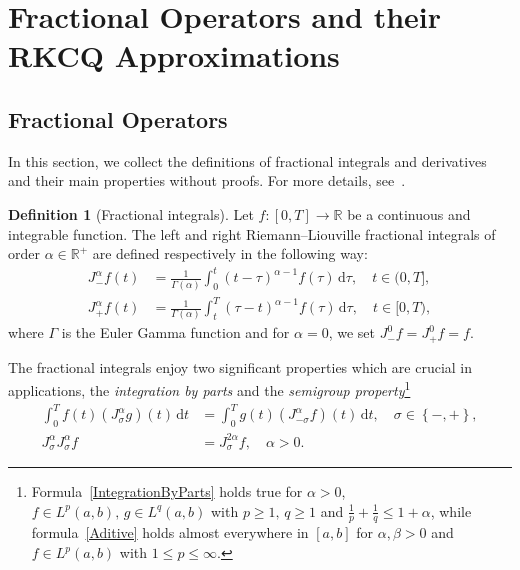 \documentclass[a4paper,10pt,reqno]{amsart}
\theoremstyle{definition}
\newtheorem{definition}{Definition}[section]
\newcommand{\R}{\mathbb{R}}      %
\newcommand{\Flder}{\rightarrow}
\newcommand{\dd}{\mathrm{d}}
\begin{document}
\section{Fractional Operators and their RKCQ Approximations}\label{FracIntegrals}

\subsection{Fractional Operators}
In this section, we collect the definitions of fractional integrals and derivatives and their main properties without proofs. For more details, see~\cite{TheBook2,TheBook}.

\begin{definition}[Fractional integrals]
Let $f:[0,T]\Flder\R$ be a continuous and integrable function. The left and right Riemann–Liouville fractional integrals of order $\alpha\in \R^+$ are defined respectively in the following way:   
\begin{subequations}\label{RLInt}
\begin{align}
J^{\alpha}_{-}f(t)&=\frac{1}{\Gamma(\alpha)}\int_0^t(t-\tau)^{\alpha-1}f(\tau)\,\dd\tau, \quad t\in (0,T],\label{RLInt:a}\\
J^{\alpha}_{+}f(t)&=\frac{1}{\Gamma(\alpha)}\int_t^T(\tau-t)^{\alpha-1}f(\tau)\,\dd\tau,\quad t\in [0,T), \label{RLInt:b}
\end{align}
\end{subequations}
where $\Gamma$ is the Euler Gamma function and for $\alpha=0$,  we set $J^{0}_{-}f=J^{0}_{+}f=f$.
\end{definition}
The fractional integrals enjoy two significant properties which are crucial in applications,   the {\it integration by parts} and  the {\it semigroup property}\footnote{Formula~\eqref{IntegrationByParts} holds true  for $\alpha>0$, $f \in  L^p (a, b),\, g\in L^q (a, b)$ with $p \geq 1,\, q \geq 1$ and
$\frac{1}{p} + \frac{1}{q} \leq 1 + \alpha$, while formula~\eqref{Aditive} holds almost everywhere in $[a,b]$ for $\alpha,\beta>0$ and $f \in  L^p (a, b)$ with
$1\leq p \leq\infty $.}~\cite[Lemmas 2.3 and 2.7]{TheBook2}
\begin{subequations}\label{FracIntProperties}
\begin{align}
\int_0^Tf(t)\left(J^{\alpha}_{\sigma}g\right)(t)\, \dd t&=\int_0^T g(t) \left(J^{\alpha}_{-\sigma}f\right)(t)\, \dd t,\quad  \sigma\in\left\{-,+\right\}, \label{IntegrationByParts}\\
J_{\sigma}^{\alpha}J_{\sigma}^{\alpha}f&=J_{\sigma}^{2\alpha}f,\quad \alpha>0. \label{Aditive}
\end{align}
\end{subequations}
\end{document}
